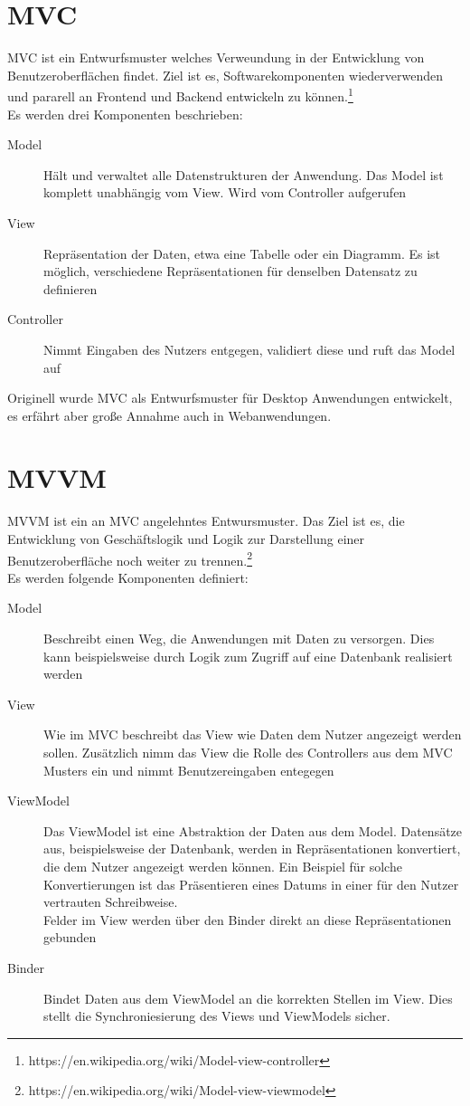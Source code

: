 \section{\acs{MVC}}
\ac{MVC} ist ein Entwurfsmuster welches Verweundung in der Entwicklung von
Benutzeroberflächen findet. Ziel ist es, Softwarekomponenten wiederverwenden und
pararell an Frontend und Backend entwickeln zu können.\footnote{https://en.wikipedia.org/wiki/Model-view-controller}\\
Es werden drei Komponenten beschrieben:
\begin{description}
\item[Model]{Hält und verwaltet alle Datenstrukturen der Anwendung. Das Model ist komplett
  unabhängig vom View. Wird vom Controller aufgerufen}
\item[View]{Repräsentation der Daten, etwa eine Tabelle oder ein Diagramm. Es
    ist möglich, verschiedene Repräsentationen für denselben Datensatz zu definieren}
\item[Controller]{Nimmt Eingaben des Nutzers entgegen, validiert diese und ruft
    das Model auf}
\end{description}
Originell wurde \ac{MVC} als Entwurfsmuster für Desktop Anwendungen entwickelt,
es erfährt aber große Annahme auch in Webanwendungen.
\section{\acs{MVVM}}
\ac{MVVM} ist ein an \ac{MVC} angelehntes Entwursmuster. Das Ziel ist es, die
Entwicklung von Geschäftslogik und Logik zur Darstellung einer
Benutzeroberfläche noch weiter zu trennen.\footnote{https://en.wikipedia.org/wiki/Model-view-viewmodel}\\
Es werden folgende Komponenten definiert:
\begin{description}
\item[Model]{Beschreibt einen Weg, die Anwendungen mit Daten zu versorgen. Dies
    kann beispielsweise durch Logik zum Zugriff auf eine Datenbank realisiert werden}
\item[View]{Wie im \ac{MVC} beschreibt das View wie Daten dem Nutzer angezeigt
    werden sollen. Zusätzlich nimm das View die Rolle des Controllers aus dem
    \ac{MVC} Musters ein und nimmt Benutzereingaben entegegen}
\item[ViewModel]{Das ViewModel ist eine Abstraktion der Daten aus dem Model.
    Datensätze aus, beispielsweise der Datenbank, werden in Repräsentationen
    konvertiert, die dem Nutzer angezeigt werden können. Ein Beispiel für solche
    Konvertierungen ist das Präsentieren eines Datums in einer für den Nutzer
    vertrauten Schreibweise.\\
    Felder im View werden über den Binder direkt an diese Repräsentationen gebunden}
\item[Binder]{Bindet Daten aus dem ViewModel an die korrekten Stellen im View.
    Dies stellt die Synchroniesierung des Views und ViewModels sicher.}
\end{description}


